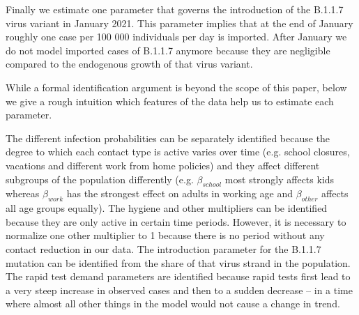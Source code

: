 Finally we estimate one parameter that governs the introduction of the B.1.1.7 virus
variant in January 2021. This parameter implies that at the end of January roughly one
case per 100 000 individuals per day is imported. After January we do not model imported
cases of B.1.1.7 anymore because they are negligible compared to the endogenous growth
of that virus variant.

While a formal identification argument is beyond the scope of this paper, below we give
a rough intuition which features of the data help us to estimate each parameter.

The different infection probabilities can be separately identified because the degree to
which each contact type is active varies over time (e.g. school closures, vacations and
different work from home policies) and they affect different subgroups of the population
differently (e.g. $\beta_{school}$ most strongly affects kids whereas
$\beta_{work}$ has the strongest effect on adults in working age and $\beta_{other}$
affects all age groups equally).
The hygiene and other multipliers can be identified because they are only active in
certain time periods. However, it is necessary to normalize one other multiplier to
1 because there is no period without any contact reduction in our data.
The introduction parameter for the B.1.1.7 mutation can be identified from the share of
that virus strand in the population. The rapid test
demand parameters are identified because rapid tests first lead to a very steep increase
in observed cases and then to a sudden decrease -- in a time where almost all other
things in the model would not cause a change in trend.